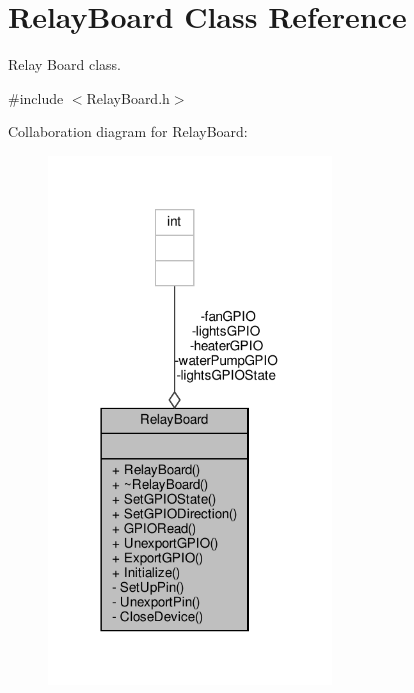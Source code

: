 \hypertarget{classRelayBoard}{}\section{Relay\+Board Class Reference}
\label{classRelayBoard}


Relay Board class.  




{\ttfamily \#include $<$Relay\+Board.\+h$>$}



Collaboration diagram for Relay\+Board\+:\nopagebreak
\begin{figure}[H]
\begin{center}
\leavevmode
\includegraphics[width=213pt]{classRelayBoard__coll__graph}
\end{center}
\end{figure}
